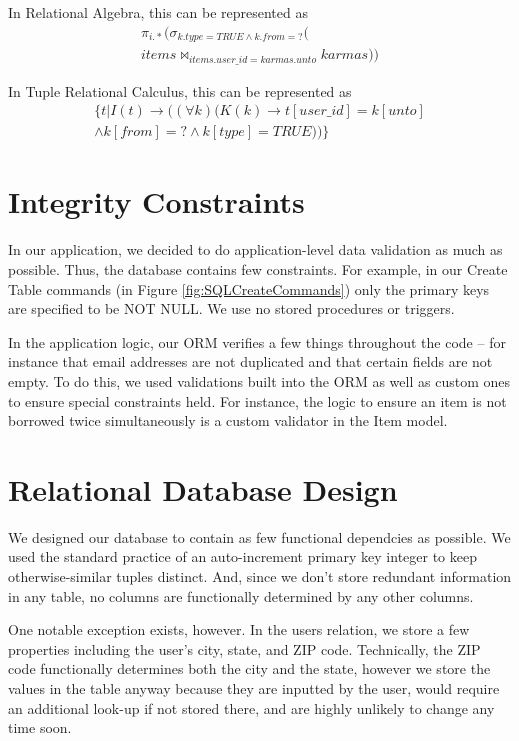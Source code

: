 \documentclass{acm_proc_article-sp}
\begin{document}
In Relational Algebra, this can be represented as
\[ \begin{split}
\pi_{i.*}(\sigma_{k.type=TRUE \land k.from=?}( \\
  items \bowtie_{items.user\_id=karmas.unto} karmas))
\end{split}\]

In Tuple Relational Calculus, this can be represented as
\[ 
\begin{split} \{ t | I(t) \to ((\forall k) (K(k) \to t[user\_id] = k[unto] \\
\land k[from] = ? \land k[type] = TRUE)) \} \end{split} \]
\section{Integrity Constraints}
In our application, we decided to do application-level data validation as much as possible. Thus, the database
contains few constraints. For example, in our Create Table commands (in Figure \ref{fig:SQLCreateCommands}) only
the primary keys are specified to be NOT NULL. We use no stored procedures or triggers.

In the application logic, our ORM verifies a few things throughout the code -- for instance that email addresses 
are not duplicated and that certain fields are not empty. To do this, we used validations built into the ORM as
well as custom ones to ensure special constraints held. For instance, the logic to ensure an item is not borrowed
twice simultaneously is a custom validator in the Item model.
\section{Relational Database Design}
We designed our database to contain as few functional dependcies as possible. We used the standard practice of an
auto-increment primary key integer to keep otherwise-similar tuples distinct. And, since we don't store redundant information
in any table, no columns are functionally determined by any other columns.

One notable exception exists, however. In the users relation, we store a few properties including the user's city, state, and ZIP code. 
Technically, the ZIP code functionally determines both the city and the state, however we store the values in the table
anyway because they are inputted by the user, would require an additional look-up if not stored there, and are highly unlikely
to change any time soon. 
\end{document}
